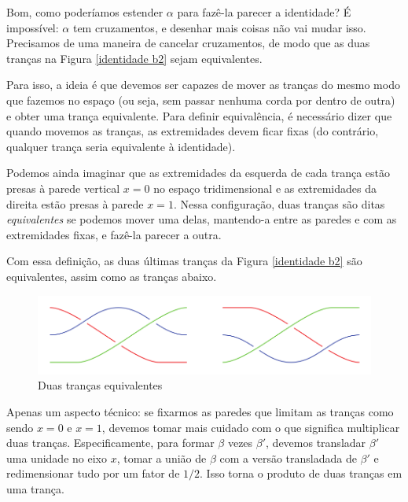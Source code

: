 	\par\vspace{0.3cm} Bom, como poderíamos estender $\alpha$ para fazê-la parecer a identidade? É impossível: $\alpha$ tem cruzamentos, e desenhar mais coisas não vai mudar isso. Precisamos de uma maneira de cancelar cruzamentos, de modo que as duas tranças na Figura \eqref{identidade b2} sejam equivalentes. 
	
	\par\vspace{0.3cm} Para isso, a ideia é que devemos ser capazes de mover as tranças do mesmo modo que fazemos no espaço (ou seja, sem passar nenhuma corda por dentro de outra) e obter uma trança equivalente. Para definir equivalência, é necessário dizer que quando movemos as tranças, as extremidades devem ficar fixas (do contrário, qualquer trança seria equivalente à identidade).
	
	\par\vspace{0.3cm} Podemos ainda imaginar que as extremidades da esquerda de cada trança estão presas à parede vertical $x=0$ no espaço tridimensional e as extremidades da direita estão presas à parede $x=1$. Nessa configuração, duas tranças são ditas \textit{equivalentes} se podemos mover uma delas, mantendo-a entre as paredes e com as extremidades fixas, e fazê-la parecer a outra. 
	
	\par\vspace{0.3cm} Com essa definição, as duas últimas tranças da Figura \eqref{identidade b2} são equivalentes, assim como as tranças abaixo.
	
	\begin{figure}[H]
		\captionsetup{justification=centering}
		\begin{center}
			\includegraphics[width=12cm]{Images/fig_18_6.png}
		\end{center}\caption{Duas tranças equivalentes}\label{trancas equivalentes}
	\end{figure}   
	
	\par\vspace{0.3cm} Apenas um aspecto técnico: se fixarmos as paredes que limitam as tranças como sendo $x = 0$ e $x=1$, devemos tomar mais cuidado com o que significa multiplicar duas tranças. Especificamente, para formar $\beta$ vezes $\beta'$, devemos transladar $\beta'$ uma unidade no eixo $x$, tomar a união de $\beta$ com a versão transladada de $\beta'$ e redimensionar tudo por um fator de $1/2$. Isso torna o produto de duas tranças em uma trança.
	

